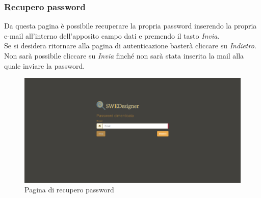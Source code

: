 \subsubsection{Recupero password}
Da questa pagina è possibile recuperare la propria password inserendo la propria e-mail all'interno dell'apposito campo dati e premendo il tasto \emph{Invia}.\\
Se si desidera ritornare alla pagina di autenticazione basterà cliccare su \textit{Indietro}.\\
Non sarà possibile cliccare su \textit{Invia} finché non sarà stata inserita la mail alla quale inviare la password.\\
\begin{figure}[H]
	\centering
		\includegraphics[width=1\linewidth]{res/img/password.png}
	\caption{Pagina di recupero password}
\end{figure}
\newpage
